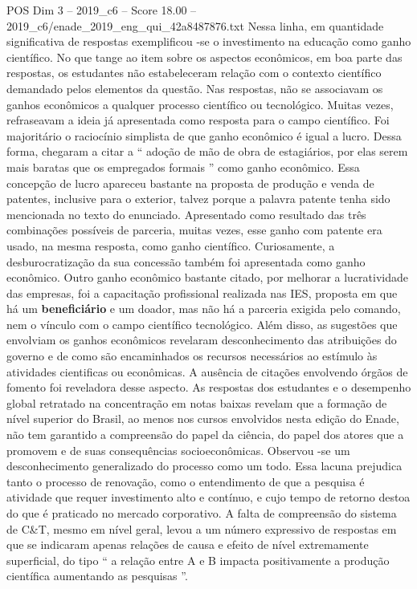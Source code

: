\begin{textsample}{POS Dim 3 – 2019\_c6 – Score 18.00 – 2019\_c6/enade\_2019\_eng\_qui\_42a8487876.txt}
Nessa linha, em quantidade significativa de respostas exemplificou -se o investimento na educação como ganho científico.
No que tange ao item sobre os aspectos econômicos, em boa parte das respostas, os estudantes não estabeleceram relação com o contexto científico demandado pelos elementos da questão.
Nas respostas, não se associavam os ganhos econômicos a qualquer processo científico ou tecnológico.
Muitas vezes, refraseavam a ideia já apresentada como resposta para o campo científico.
Foi majoritário o raciocínio simplista de que ganho econômico é igual a lucro.
Dessa forma, chegaram a citar a “ adoção de mão de obra de estagiários, por elas serem mais baratas que os empregados formais ” como ganho econômico.
Essa concepção de lucro apareceu bastante na proposta de produção e venda de patentes, inclusive para o exterior, talvez porque a palavra patente tenha sido mencionada no texto do enunciado.
Apresentado como resultado das três combinações possíveis de parceria, muitas vezes, esse ganho com patente era usado, na mesma resposta, como ganho científico.
Curiosamente, a desburocratização da sua concessão também foi apresentada como ganho econômico.
Outro ganho econômico bastante citado, por melhorar a lucratividade das empresas, foi a capacitação profissional realizada nas IES, proposta em que há um \textbf{beneficiário} e um doador, mas não há a parceria exigida pelo comando, nem o vínculo com o campo científico tecnológico.
Além disso, as sugestões que envolviam os ganhos econômicos revelaram desconhecimento das atribuições do governo e de como são encaminhados os recursos necessários ao estímulo às atividades cientificas ou econômicas.
A ausência de citações envolvendo órgãos de fomento foi reveladora desse aspecto.
As respostas dos estudantes e o desempenho global retratado na concentração em notas baixas revelam que a formação de nível superior do Brasil, ao menos nos cursos envolvidos nesta edição do Enade, não tem garantido a compreensão do papel da ciência, do papel dos atores que a promovem e de suas consequências socioeconômicas.
Observou -se um desconhecimento generalizado do processo como um todo.
Essa lacuna prejudica tanto o processo de renovação, como o entendimento de que a pesquisa é atividade que requer investimento alto e contínuo, e cujo tempo de retorno destoa do que é praticado no mercado corporativo.
A falta de compreensão do sistema de C\&T, mesmo em nível geral, levou a um número expressivo de respostas em que se indicaram apenas relações de causa e efeito de nível extremamente superficial, do tipo “ a relação entre A e B impacta positivamente a produção científica aumentando as pesquisas ”.

\end{textsample}
